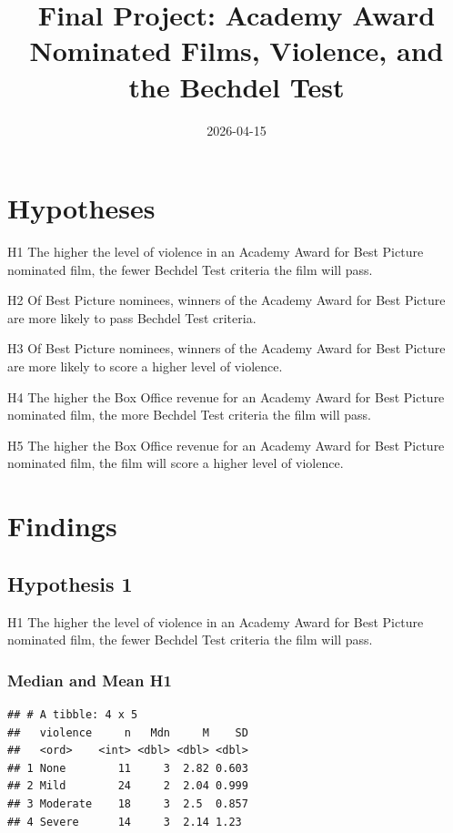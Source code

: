 \documentclass[
]{article}
\title{Final Project: Academy Award Nominated Films, Violence, and the
Bechdel Test}
\author{}
\date{\vspace{-2.5em}2026-04-15}
\begin{document}
\maketitle

\section{Hypotheses}\label{hypotheses}

H1 The higher the level of violence in an Academy Award for Best Picture
nominated film, the fewer Bechdel Test criteria the film will pass.

H2 Of Best Picture nominees, winners of the Academy Award for Best
Picture are more likely to pass Bechdel Test criteria.

H3 Of Best Picture nominees, winners of the Academy Award for Best
Picture are more likely to score a higher level of violence.

H4 The higher the Box Office revenue for an Academy Award for Best
Picture nominated film, the more Bechdel Test criteria the film will
pass.

H5 The higher the Box Office revenue for an Academy Award for Best
Picture nominated film, the film will score a higher level of violence.

\section{Findings}\label{findings}

\subsection{Hypothesis 1}\label{hypothesis-1}

H1 The higher the level of violence in an Academy Award for Best Picture
nominated film, the fewer Bechdel Test criteria the film will pass.

\subsubsection{Median and Mean H1}\label{median-and-mean-h1}

\begin{verbatim}
## # A tibble: 4 x 5
##   violence     n   Mdn     M    SD
##   <ord>    <int> <dbl> <dbl> <dbl>
## 1 None        11     3  2.82 0.603
## 2 Mild        24     2  2.04 0.999
## 3 Moderate    18     3  2.5  0.857
## 4 Severe      14     3  2.14 1.23
\end{verbatim}
\end{document}
